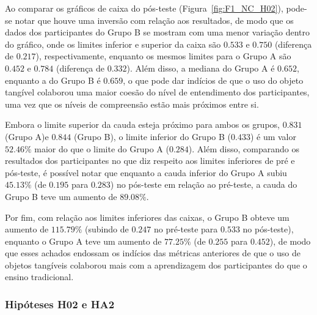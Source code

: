 Ao comparar os gráficos de caixa do pós-teste (Figura~\ref{fig:F1_NC_H02}), pode-se notar que houve uma inversão com relação aos resultados, de modo que os dados dos participantes do Grupo B se mostram com uma menor variação dentro do gráfico, onde os limites inferior e superior da caixa são $0.533$ e $0.750$ (diferença de $0.217$), respectivamente, enquanto os mesmos limites para o Grupo A são $0.452$ e $0.784$ (diferença de $0.332$). Além disso, a mediana do Grupo A é $0.652$, enquanto a do Grupo B é $0.659$, o que pode dar indícios de que o uso do objeto tangível colaborou uma maior coesão do nível de entendimento dos participantes, uma vez que os níveis de compreensão estão mais próximos entre si. 

Embora o limite superior da cauda esteja próximo para ambos os grupos, $0.831$ (Grupo A)e $0.844$ (Grupo B), o limite inferior do Grupo B ($0.433$) é um valor $52.46\%$ maior do que o limite do Grupo A ($0.284$). Além disso, comparando os resultados dos participantes no que diz respeito aos limites inferiores de pré e pós-teste, é possível notar que enquanto a cauda inferior do Grupo A subiu $45.13\%$ (de $0.195$ para $0.283$) no pós-teste em relação ao pré-teste, a cauda do Grupo B teve um aumento de $89.08\%$. 

Por fim, com relação aos limites inferiores das caixas, o Grupo B obteve um aumento de $115.79\%$ (subindo de $0.247$ no pré-teste para $0.533$ no pós-teste), enquanto o Grupo A teve um aumento de $77.25\%$ (de $0.255$ para $0.452$), de modo que esses achados endossam os indícios das métricas anteriores de que o uso de objetos tangíveis colaborou mais com a aprendizagem dos participantes do que o ensino tradicional.



\subsubsection{Hipóteses H02 e HA2}

